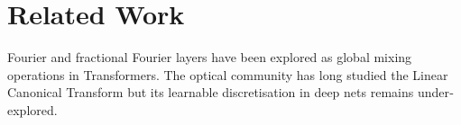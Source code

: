 \section{Related Work}
Fourier and fractional Fourier layers have been explored as global mixing operations in Transformers\citep{lee2021fnet,chi2022flashfft}.  The optical community has long studied the Linear Canonical Transform\citep{pei1997,chen2009} but its learnable discretisation in deep nets remains under‐explored.